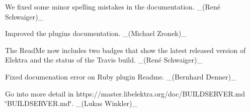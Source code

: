 \begin{DoxyItemize}
\item We fixed some minor spelling mistakes in the documentation. \+\_\+(René Schwaiger)\+\_\+
\item Improved the plugins documentation. \+\_\+(\+Michael Zronek)\+\_\+
\item The Read\+Me now includes two badges that show the latest released version of Elektra and the status of the Travis build. \+\_\+(René Schwaiger)\+\_\+
\item Fixed documenation error on Ruby plugin Readme. \+\_\+(\+Bernhard Denner)\+\_\+
\item Go into more detail in https\+://master.libelektra.\+org/doc/\+B\+U\+I\+L\+D\+S\+E\+R\+V\+ER.md \char`\"{}\+B\+U\+I\+L\+D\+S\+E\+R\+V\+E\+R.\+md\char`\"{}. \+\_\+(\+Lukas Winkler)\+\_\+
\end{DoxyItemize}


